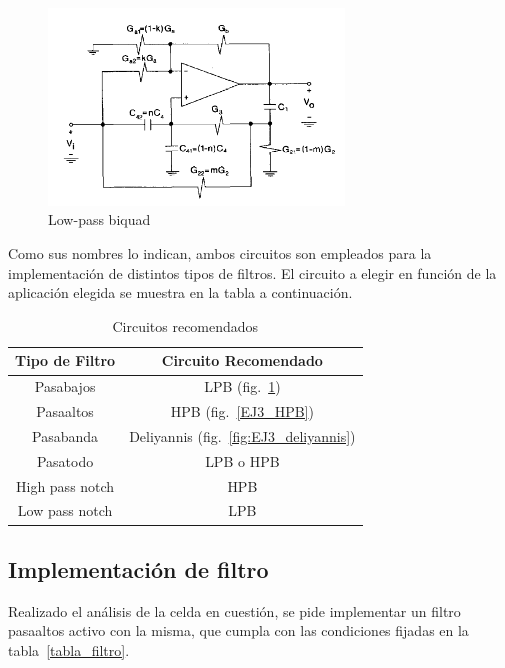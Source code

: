 \begin{figure}[H] 
    \centering
    \includegraphics[width=0.7\textwidth]{../EJ3/Resources/LPB.png}
    \caption{Low-pass biquad}
    \label{EJ3_LPB}
\end{figure}

Como sus nombres lo indican, ambos circuitos son empleados para la implementaci\'on de distintos tipos de filtros. El circuito a elegir en funci\'on de la aplicaci\'on elegida se muestra en la tabla a continuaci\'on.

\begin{table}[H]
    \centering
    \begin{tabular}{c c}
        Tipo de Filtro & Circuito Recomendado \\
        \hline
        Pasabajos & LPB (fig.~\ref{EJ3_LPB}) \\
        Pasaaltos & HPB (fig.~\ref{EJ3_HPB}) \\
        Pasabanda & Deliyannis (fig.~\ref{fig:EJ3_deliyannis}) \\
        Pasatodo & LPB o HPB \\
        High pass notch & HPB \\
        Low pass notch & LPB\\
    \end{tabular}
    \caption{Circuitos recomendados}
    \label{tabla_circuitos}
\end{table}


\subsection{Implementaci\'on de filtro}
Realizado el an\'alisis de la celda en cuesti\'on, se pide implementar un filtro pasaaltos activo con la misma, que cumpla con las condiciones fijadas en la tabla~\ref{tabla_filtro}.

